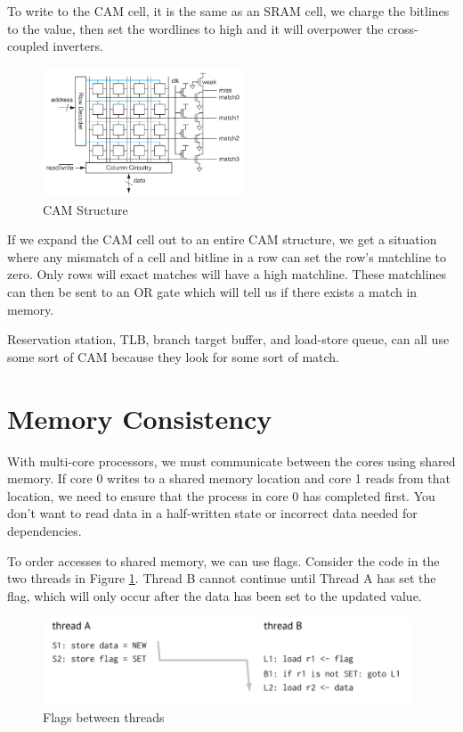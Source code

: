 \documentclass{article}
\begin{document}
To write to the CAM cell, it is the same as an SRAM cell, we charge the bitlines to the value, then set the wordlines to high and it will overpower the cross-coupled inverters. 

\begin{figure}[ht!]
\centering
\includegraphics[width=60mm]{img/CAMs.png}
\caption{CAM Structure}
\end{figure}


If we expand the CAM cell out to an entire CAM structure, we get a situation where any mismatch of a cell and bitline in a row can set the row's matchline to zero. Only rows will exact matches will have a high matchline. These matchlines can then be sent to an OR gate which will tell us if there exists a match in memory.

Reservation station, TLB, branch target buffer, and load-store queue, can all use some sort of CAM because they look for some sort of match. 

\section{Memory Consistency}

With multi-core processors, we must communicate between the cores using shared memory. If core 0 writes to a shared memory location and core 1 reads from that location, we need to ensure that the process in core 0 has completed first. You don't want to read data in a half-written state or incorrect data needed for dependencies.

To order accesses to shared memory, we can use flags. Consider the code in the two threads in Figure \ref{Flag}. Thread B cannot continue until Thread A has set the flag, which will only occur after the data has been set to the updated value. 

\begin{figure}[ht!]
\centering
\includegraphics[width=110mm]{img/flags.png}
\caption{Flags between threads}
\label{Flag}
\end{figure}
\end{document}

